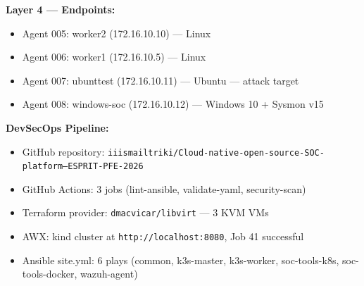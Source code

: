 \documentclass[12pt,a4paper]{report}
\begin{document}
\textbf{Layer 4 --- Endpoints:}
\begin{itemize}
  \item Agent 005: worker2 (172.16.10.10) --- Linux
  \item Agent 006: worker1 (172.16.10.5) --- Linux
  \item Agent 007: ubunttest (172.16.10.11) --- Ubuntu --- attack target
  \item Agent 008: windows-soc (172.16.10.12) --- Windows 10 + Sysmon v15
\end{itemize}

\textbf{DevSecOps Pipeline:}
\begin{itemize}
  \item GitHub repository: \texttt{iiismailtriki/Cloud-native-open-source-SOC-platform---ESPRIT-PFE-2026}
  \item GitHub Actions: 3 jobs (lint-ansible, validate-yaml, security-scan)
  \item Terraform provider: \texttt{dmacvicar/libvirt} --- 3 KVM VMs
  \item AWX: kind cluster at \texttt{http://localhost:8080}, Job 41 successful
  \item Ansible site.yml: 6 plays (common, k3s-master, k3s-worker, soc-tools-k8s, soc-tools-docker, wazuh-agent)
\end{itemize}
\end{document}
